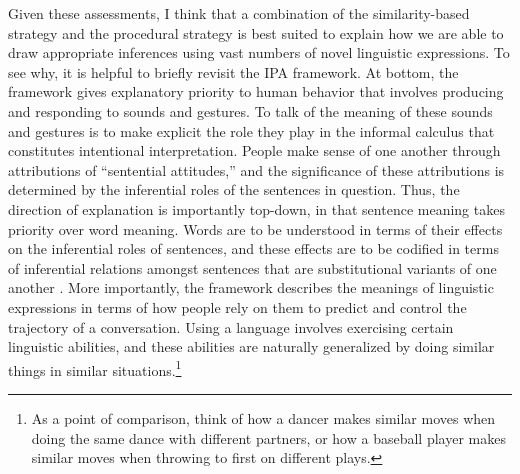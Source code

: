 Given these assessments, I think that a combination of the similarity-based strategy and the procedural strategy is best suited to explain how we are able to draw appropriate inferences using vast numbers of novel linguistic expressions. To see why, it is helpful to briefly revisit the IPA framework. At bottom, the framework gives explanatory priority to human behavior that involves producing and responding to sounds and gestures. To talk of the meaning of these sounds and gestures is to make explicit the role they play in the informal calculus that constitutes intentional interpretation. People make sense of one another through attributions of ``sentential attitudes,'' and the significance of these attributions is determined by the inferential roles of the sentences in question. Thus, the direction of explanation is importantly top-down, in that sentence meaning takes priority over word meaning. Words are to be understood in terms of their effects on the inferential roles of sentences, and these effects are to be codified in terms of inferential relations amongst sentences that are substitutional variants of one another \citep{Brandom:1994}. More importantly, the framework describes the meanings of linguistic expressions in terms of how people rely on them to predict and control the trajectory of a conversation. Using a language involves exercising certain linguistic abilities, and these abilities are naturally generalized by doing similar things in similar situations.\footnote{As a point of comparison, think of how a dancer makes similar moves when doing the same dance with different partners, or how a baseball player makes similar moves when throwing to first on different plays.}

